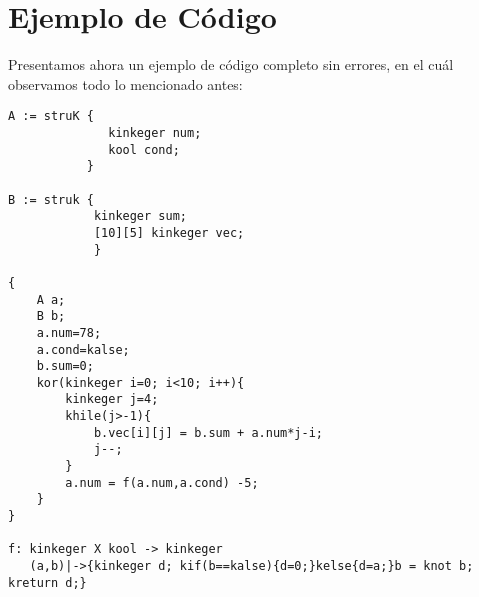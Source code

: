 \documentclass[a4paper, 11pt, twoside, openany, onecolumn, final]{memoir}
\begin{document}
	 \section{Ejemplo de Código}
	 Presentamos ahora un ejemplo de código completo sin errores, en el cuál observamos todo lo mencionado antes:
\begin{verbatim}
A := struK {
              kinkeger num;
              kool cond;
           }
           
B := struk {
            kinkeger sum;
            [10][5] kinkeger vec;
            }
			
{
    A a;
    B b;
    a.num=78;
    a.cond=kalse;
    b.sum=0;
    kor(kinkeger i=0; i<10; i++){
        kinkeger j=4;
        khile(j>-1){
            b.vec[i][j] = b.sum + a.num*j-i;
            j--;
        }
        a.num = f(a.num,a.cond) -5;	
    }
}

f: kinkeger X kool -> kinkeger
   (a,b)|->{kinkeger d; kif(b==kalse){d=0;}kelse{d=a;}b = knot b; kreturn d;}  
\end{verbatim}
	
\end{document}
